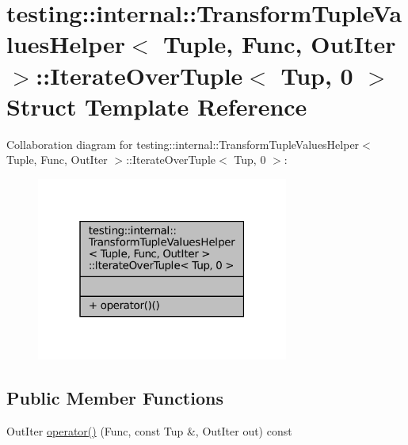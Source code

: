 \hypertarget{structtesting_1_1internal_1_1TransformTupleValuesHelper_1_1IterateOverTuple_3_01Tup_00_010_01_4}{}\section{testing\+:\+:internal\+:\+:Transform\+Tuple\+Values\+Helper$<$ Tuple, Func, Out\+Iter $>$\+:\+:Iterate\+Over\+Tuple$<$ Tup, 0 $>$ Struct Template Reference}
\label{structtesting_1_1internal_1_1TransformTupleValuesHelper_1_1IterateOverTuple_3_01Tup_00_010_01_4}


Collaboration diagram for testing\+:\+:internal\+:\+:Transform\+Tuple\+Values\+Helper$<$ Tuple, Func, Out\+Iter $>$\+:\+:Iterate\+Over\+Tuple$<$ Tup, 0 $>$\+:
\nopagebreak
\begin{figure}[H]
\begin{center}
\leavevmode
\includegraphics[width=235pt]{structtesting_1_1internal_1_1TransformTupleValuesHelper_1_1IterateOverTuple_3_01Tup_00_010_01_4__coll__graph}
\end{center}
\end{figure}
\subsection*{Public Member Functions}
\begin{DoxyCompactItemize}
\item 
Out\+Iter \hyperlink{structtesting_1_1internal_1_1TransformTupleValuesHelper_1_1IterateOverTuple_3_01Tup_00_010_01_4_ae045ff24334765553981b7dc25771128}{operator()} (Func, const Tup \&, Out\+Iter out) const
\end{DoxyCompactItemize}


